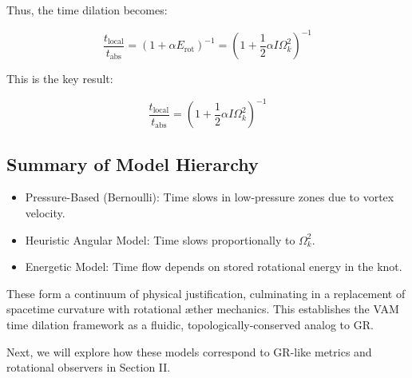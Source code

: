 Thus, the time dilation becomes:

\begin{equation}
\frac{t_{\text{local}}}{t_{\text{abs}}} = \left(1 + \alpha E_{\text{rot}} \right)^{-1} = \left(1 + \frac{1}{2} \alpha I \Omega_k^2 \right)^{-1}\label{eq:time_dilation_rotational_energy}
\end{equation}

This is the key result:

\begin{equation}
    \boxed{\frac{t_{\text{local}}}{t_{\text{abs}}} = \left(1 + \frac{1}{2} \alpha I \Omega_k^2 \right)^{-1}}
    \label{eq:localtime_vortex}
\end{equation}

\subsection{Summary of Model Hierarchy}

\begin{itemize}
\item Pressure-Based (Bernoulli): Time slows in low-pressure zones due to vortex velocity.
\item Heuristic Angular Model: Time slows proportionally to $\Omega_k^2$.
\item Energetic Model: Time flow depends on stored rotational energy in the knot.
\end{itemize}

These form a continuum of physical justification, culminating in a replacement of spacetime curvature with rotational æther mechanics. This establishes the VAM time dilation framework as a fluidic, topologically-conserved analog to GR.

Next, we will explore how these models correspond to GR-like metrics and rotational observers in Section II.